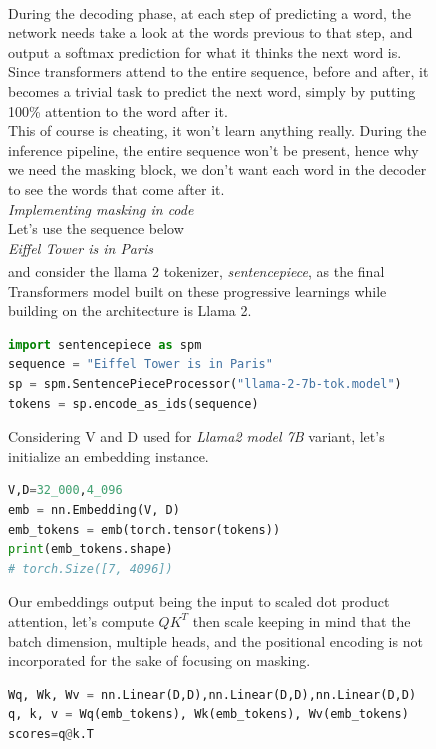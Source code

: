 \documentclass[12pt]{article}
\newcommand{\customtext}[3]{%
    \vspace{#2} %
    \fontsize{13}{8}\textcolor{#1}{\textit{#3}}%
}
\newcommand{\sidecite}[1]{\textsuperscript{\textcolor{blue}{\textbf{\scriptsize#1}}}}
\newcommand{\maincitecount}{\sidecite{\stepcounter{maincite}\themaincite}}
\begin{document}
\begin{figure}[!htb]
    \begin{minipage}[t]{0.65\textwidth}
    \raggedright
    During the decoding phase, at each step of predicting a word{\maincitecount}, the network needs take a look 
    at the words previous to that step, and output a softmax prediction for what it thinks the next word 
    is. Since transformers attend to the entire sequence, before and after, it becomes a trivial task to predict 
    the next word, simply by putting 100\% attention to the word after it.\\
    This of course is cheating, it won't learn anything really. During the inference pipeline, the entire sequence 
    won't be present, hence why we need the masking block, we don't want each word in the decoder to see the words 
    that come after it.\\
    \customtext{xtitle}{1em}{Implementing masking in code}\\
    Let's use the sequence below\\
    {\it Eiffel Tower is in Paris}\\
    and consider the llama 2 tokenizer{\maincitecount}, {\it sentencepiece}, as the final Transformers model built on these progressive learnings  
    while building on the architecture is Llama 2.
\begin{lstlisting}[language=python,style=python,basicstyle=\ttfamily\footnotesize]
import sentencepiece as spm 
sequence = "Eiffel Tower is in Paris"
sp = spm.SentencePieceProcessor("llama-2-7b-tok.model")
tokens = sp.encode_as_ids(sequence)
\end{lstlisting}
Considering V and D used for {\it Llama2 model 7B} variant, let's initialize an embedding instance. 
\begin{lstlisting}[language=python,style=python,basicstyle=\ttfamily\footnotesize]
V,D=32_000,4_096
emb = nn.Embedding(V, D)
emb_tokens = emb(torch.tensor(tokens))
print(emb_tokens.shape)
# torch.Size([7, 4096])
\end{lstlisting}
Our embeddings output being the input to scaled dot product attention, let's compute $QK^T$ then scale
keeping in mind that the batch dimension, multiple heads, and the positional encoding is not incorporated 
for the sake of focusing on masking.
\begin{lstlisting}[language=python,style=python,basicstyle=\ttfamily\footnotesize]
Wq, Wk, Wv = nn.Linear(D,D),nn.Linear(D,D),nn.Linear(D,D)
q, k, v = Wq(emb_tokens), Wk(emb_tokens), Wv(emb_tokens)
scores=q@k.T

\end{lstlisting}
\end{minipage}
\end{figure}
\end{document}
